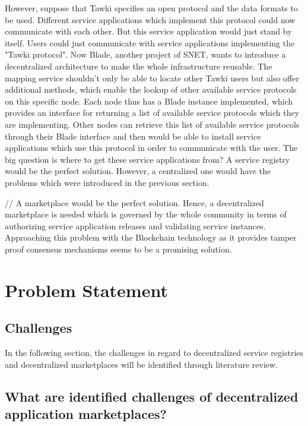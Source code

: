 However, suppose that Tawki specifies an open protocol and the data formats to be used. Different service applications which implement this protocol could now communicate with each other. But this service application would just stand by itself. Users could just communicate with service applications implementing the "Tawki protocol". Now Blade, another project of SNET, wants to introduce a decentralized architecture to make the whole infrastructure reusable. The mapping service shouldn't only be able to locate other Tawki users but also offer additional methods, which enable the lookup of other available service protocols on this specific node. Each node thus has a Blade instance implemented, which provides an interface for returning a list of available service protocols which they are implementing. Other nodes can retrieve this list of available  service protocols through their Blade interface and then would be able to install service applications which use this protocol in order to communicate with the user. The big question is where to get these service applications from? A service registry would be the perfect solution. However, a centralized one would have the problems which were introduced in the previous section.


//
A marketplace would be the perfect solution.  Hence, a decentralized marketplace is needed which is governed by the whole community in terms of authorizing service application releases and validating service instances. Approaching this problem with the Blockchain technology as it provides tamper proof consensus mechanisms seems to be a promising solution.  
    
 
\section{Problem Statement}




\subsection{Challenges}
In the following section, the challenges in regard to decentralized service registries and decentralized marketplaces will be identified through literature review. 

\subsection{What are identified challenges of decentralized application marketplaces?}



